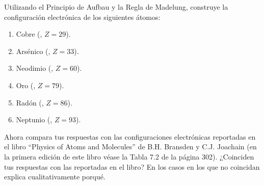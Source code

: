 \documentclass[./../main.tex]{subfiles}
\begin{document}
    \color{blue}
    \begin{exercise}
        Utilizando el Principio de Aufbau y la Regla de Madelung, construye la configuración electrónica de los siguientes átomos:

        \begin{enumerate}[threecol]
            \item Cobre (, \(Z = 29\)).
            \item Arsénico (, \(Z = 33\)).
            \item Neodimio (, \(Z = 60\)).
            \item Oro (, \(Z = 79\)).
            \item Radón (, \(Z = 86\)).
            \item Neptunio (, \(Z = 93\)).
        \end{enumerate}

        Ahora compara tus respuestas con las configuraciones electrónicas reportadas en el libro ``Physics of Atoms and Molecules''  de B.H. Bransden y C.J. Joachain (en la primera edición de este libro véase la Tabla 7.2 de la página 302).
        ¿Coinciden tus respuestas con las reportadas en el libro? En los casos en los que no coincidan explica cualitativamente porqué.
    \end{exercise}
\end{document}
